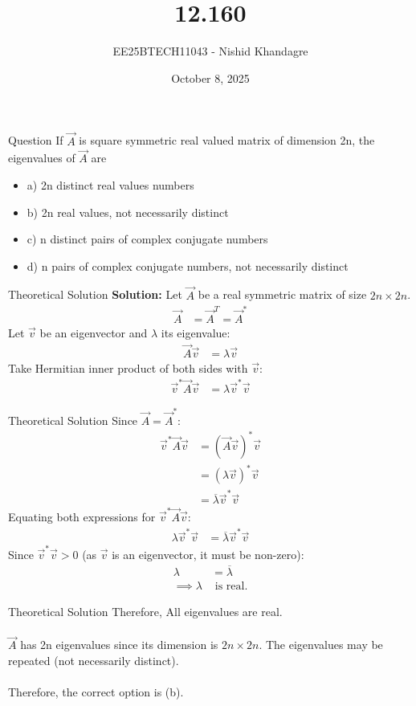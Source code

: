 \documentclass{beamer}
\title
{12.160}
\date{October 8, 2025}
\author
{EE25BTECH11043 - Nishid Khandagre}
\begin{document}
\frame{\titlepage}

\begin{frame}{Question}
If $\vec{A}$ is square symmetric real valued matrix of dimension 2n, the eigenvalues of $\vec{A}$ are
\begin{itemize}
    \item a) 2n distinct real values numbers
    \item b) 2n real values, not necessarily distinct
    \item c) n distinct pairs of complex conjugate numbers
    \item d) n pairs of complex conjugate numbers, not necessarily distinct
\end{itemize}
\end{frame}

\begin{frame}{Theoretical Solution}
\textbf{Solution: }
Let $\vec{A}$ be a real symmetric matrix of size $2n \times 2n$.
\begin{align}
    \vec{A} &= \vec{A}^T = \vec{A}^*
\end{align}
Let $\vec{v}$ be an eigenvector and $\lambda$ its eigenvalue:
\begin{align}
    \vec{A} \vec{v} &= \lambda \vec{v}
\end{align}
Take Hermitian inner product of both sides with $\vec{v}$:
\begin{align}
    \vec{v}^* \vec{A} \vec{v} &= \lambda \vec{v}^* \vec{v}
\end{align}
\end{frame}

\begin{frame}{Theoretical Solution}
Since $\vec{A} = \vec{A}^*$:
\begin{align}
    \vec{v}^* \vec{A} \vec{v} &= (\vec{A} \vec{v})^* \vec{v} \\
    &= (\lambda \vec{v})^* \vec{v} \\
    &= \overline{\lambda} \vec{v}^* \vec{v}
\end{align}
Equating both expressions for $\vec{v}^* \vec{A} \vec{v}$:
\begin{align}
    \lambda \vec{v}^* \vec{v} &= \overline{\lambda} \vec{v}^* \vec{v}
\end{align}
Since $\vec{v}^* \vec{v} > 0$ (as $\vec{v}$ is an eigenvector, it must be non-zero):
\begin{align}
    \lambda &= \overline{\lambda} \\
    \implies \lambda &\text{ is real.}
\end{align}
\end{frame}

\begin{frame}{Theoretical Solution}
Therefore, All eigenvalues are real.\\\\
$\vec{A}$ has 2n eigenvalues since its dimension is $2n \times 2n$.
The eigenvalues may be repeated (not necessarily distinct).\\\\
Therefore, the correct option is (b).
\end{frame}
\end{document}
